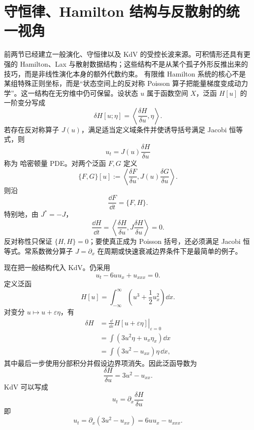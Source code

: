 \section{守恒律、Hamilton 结构与反散射的统一视角}

前两节已经建立一般演化、守恒律以及 KdV 的受控长波来源。可积情形还具有更强的 Hamilton、Lax 与散射数据结构；这些结构不是从某个孤子外形反推出来的技巧，而是非线性演化本身的额外代数约束。
有限维 Hamilton 系统的核心不是某组特殊正则坐标，而是“状态空间上的反对称 Poisson 算子把能量梯度变成动力学”。这一结构在无穷维中仍可保留。设状态 $u$ 属于函数空间 $X$，泛函 $H[u]$ 的一阶变分写成
\[
\delta H[u;\eta]
=\left\langle \frac{\delta H}{\delta u},\eta\right\rangle.
\]
若存在反对称算子 $J(u)$，满足适当定义域条件并使诱导括号满足 Jacobi 恒等式，则
\begin{equation}
 u_t=J(u)\frac{\delta H}{\delta u}
\label{eq:general-hamiltonian-pde}
\end{equation}
称为 哈密顿量 PDE。对两个泛函 $F,G$ 定义
\begin{equation}
\{F,G\}[u]
:=\left\langle
\frac{\delta F}{\delta u},
J(u)\frac{\delta G}{\delta u}
\right\rangle.
\label{eq:functional-poisson-bracket}
\end{equation}
则沿
\[
\frac{\dd F}{\dd t}=\{F,H\}.
\]
特别地，由 $J^*=-J$，
\[
\frac{\dd H}{\dd t}
=\left\langle \frac{\delta H}{\delta u},
J\frac{\delta H}{\delta u}\right\rangle=0.
\]
反对称性只保证 $\{H,H\}=0$；要使真正成为 Poisson 括号，还必须满足 Jacobi 恒等式。常系数微分算子 $J=\partial_x$ 在周期或快速衰减边界条件下是最简单的例子。

现在把一般结构代入 KdV。仍采用
\[
u_t-6u u_x+u_{xxx}=0.
\]
定义泛函
\[
H[u]=\int_{-\infty}^{\infty}
\left(u^3+\frac12u_x^2\right)\dd x.
\]
对变分 $u\mapsto u+\varepsilon\eta$，有
\[
\begin{aligned}
\delta H
&=\left.\frac{\dd}{\dd\varepsilon}
H[u+\varepsilon\eta]\right|_{\varepsilon=0}\\
&=\int\left(3u^2\eta+u_x\eta_x\right)\dd x\\
&=\int\left(3u^2-u_{xx}\right)\eta\,\dd x,
\end{aligned}
\]
其中最后一步使用分部积分并假设边界项消失。因此泛函导数为
\[
\frac{\delta H}{\delta u}=3u^2-u_{xx}.
\]
KdV 可以写成
\begin{equation*}{
u_t=\partial_x\frac{\delta H}{\delta u}}\end{equation*}
即
\[
u_t=\partial_x(3u^2-u_{xx})=6u u_x-u_{xxx}.
\]

